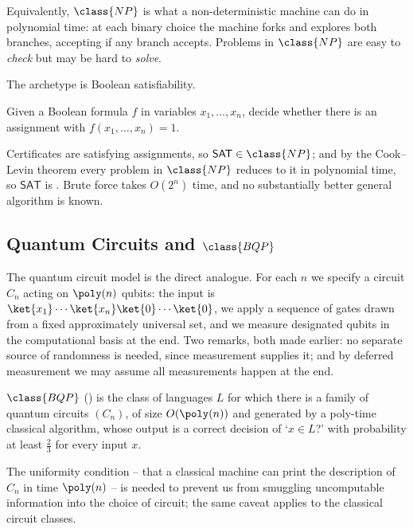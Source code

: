 Equivalently, $\class{NP}$ is what a non-deterministic machine can do in polynomial time: at each binary choice the machine forks and explores both branches, accepting if any branch accepts. Problems in $\class{NP}$ are easy to \emph{check} but may be hard to \emph{solve}.

The archetype is Boolean satisfiability.

\begin{definition}
	Given a Boolean formula $f$ in variables $x_1,\dots,x_n$, decide whether there is an assignment with $f(x_1,\dots,x_n)=1$.
\end{definition}

Certificates are satisfying assignments, so $\mathsf{SAT}\in\class{NP}$; and by the Cook--Levin theorem every problem in $\class{NP}$ reduces to it in polynomial time, so $\mathsf{SAT}$ is . Brute force takes $O(2^n)$ time, and no substantially better general algorithm is known.

\subsection{Quantum Circuits and \texorpdfstring{$\class{BQP}$}{BQP}}

The quantum circuit model is the direct analogue. For each $n$ we specify a circuit $C_n$ acting on $\poly(n)$ qubits: the input is $\ket{x_1}\cdots\ket{x_n}\ket{0}\cdots\ket{0}$, we apply a sequence of gates drawn from a fixed approximately universal set, and we measure designated qubits in the computational basis at the end. Two remarks, both made earlier: no separate source of randomness is needed, since measurement supplies it; and by deferred measurement we may assume all measurements happen at the end.

\begin{definition}
	$\class{BQP}$ () is the class of languages $L$ for which there is a family of quantum circuits $(C_n)$, of size $O(\poly(n))$ and generated by a poly-time classical algorithm, whose output is a correct decision of `$x\in L$?' with probability at least $\tfrac23$ for every input $x$.
\end{definition}

The uniformity condition -- that a classical machine can print the description of $C_n$ in time $\poly(n)$ -- is needed to prevent us from smuggling uncomputable information into the choice of circuit; the same caveat applies to the classical circuit classes.

